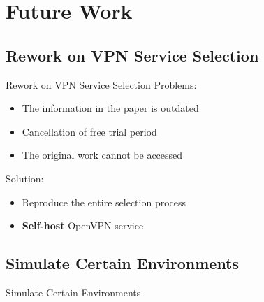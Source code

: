 \documentclass{beamer}
\begin{document}
\section{Future Work}

\subsection{Rework on VPN Service Selection}

\begin{frame}{Rework on VPN Service Selection}
  Problems:
  \begin{itemize}
    \item The information in the paper is outdated
    \item Cancellation of free trial period
    \item The original work cannot be accessed\footnotemark{}
  \end{itemize}

  Solution:
  \begin{itemize}
    \item Reproduce the entire selection process
    \item \textbf{Self-host} OpenVPN service\footnotemark{}
  \end{itemize}

\end{frame}

\subsection{Simulate Certain Environments}

\begin{frame}{Simulate Certain Environments}
\end{frame}
\end{document}
